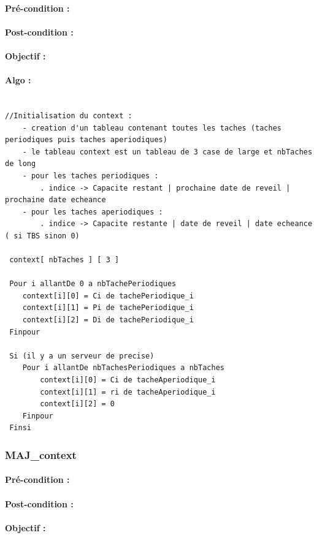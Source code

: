 				\paragraph{Pré-condition :} 
				\paragraph{Post-condition :} 
				\paragraph{Objectif :} 
				\paragraph{Algo :} 
					\begin{lstlisting}

//Initialisation du context : 
 	- creation d'un tableau contenant toutes les taches (taches periodiques puis taches aperiodiques)
 	- le tableau context est un tableau de 3 case de large et nbTaches de long
 	- pour les taches periodiques :
 		. indice -> Capacite restant | prochaine date de reveil | prochaine date echeance
 	- pour les taches aperiodiques : 
 		. indice -> Capacite restante | date de reveil | date echeance ( si TBS sinon 0)
 		 
 context[ nbTaches ] [ 3 ]
 
 Pour i allantDe 0 a nbTachePeriodiques
 	context[i][0] = Ci de tachePeriodique_i
 	context[i][1] = Pi de tachePeriodique_i
 	context[i][2] = Di de tachePeriodique_i
 Finpour
 
 Si (il y a un serveur de precise)
 	Pour i allantDe nbTachesPeriodiques a nbTaches
 		context[i][0] = Ci de tacheAperiodique_i
 		context[i][1] = ri de tacheAperiodique_i
 		context[i][2] = 0 
 	Finpour
 Finsi
					\end{lstlisting}			
					
			\subsubsection{MAJ\_context}
				\paragraph{Pré-condition :} 
				\paragraph{Post-condition :} 
				\paragraph{Objectif :} 

